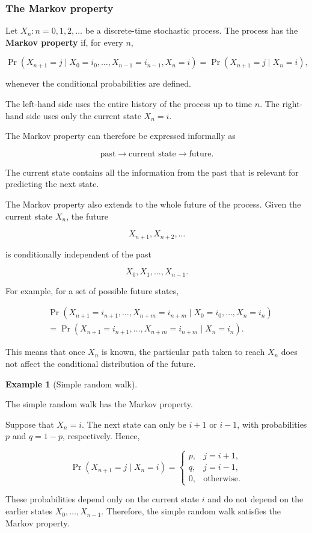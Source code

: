 \documentclass[
  letterpaper,
  DIV=11,
  numbers=noendperiod]{scrartcl}
\theoremstyle{definition}
\newtheorem{example}{Example}[section]
\theoremstyle{remark}
\begin{document}
\subsubsection{The Markov property}\label{the-markov-property-1}

Let \({X_n:n=0,1,2,\ldots}\) be a discrete-time stochastic process. The
process has the \textbf{Markov property} if, for every \(n\),

\[
\Pr(X_{n+1}=j\mid X_0=i_0,\ldots,X_{n-1}=i_{n-1},X_n=i)
=\Pr(X_{n+1}=j\mid X_n=i),
\]

whenever the conditional probabilities are defined.

The left-hand side uses the entire history of the process up to time
\(n\). The right-hand side uses only the current state \(X_n=i\).

The Markov property can therefore be expressed informally as

\[
\boxed{\text{past} \longrightarrow \text{current state} \longrightarrow \text{future}.}
\]

The current state contains all the information from the past that is
relevant for predicting the next state.

The Markov property also extends to the whole future of the process.
Given the current state \(X_n\), the future

\[
X_{n+1},X_{n+2},\ldots
\]

is conditionally independent of the past

\[
X_0,X_1,\ldots,X_{n-1}.
\]

For example, for a set of possible future states,

\[
\begin{aligned}
&\Pr(X_{n+1}=i_{n+1},\ldots,X_{n+m}=i_{n+m}\mid X_0=i_0,\ldots,X_n=i_n)\\
&=
\Pr(X_{n+1}=i_{n+1},\ldots,X_{n+m}=i_{n+m}\mid X_n=i_n).
\end{aligned}
\]

This means that once \(X_n\) is known, the particular path taken to
reach \(X_n\) does not affect the conditional distribution of the
future.

\begin{example}[Simple random
walk]\protect\hypertarget{exm-walk}{}\label{exm-walk}

The simple random walk has the Markov property.

Suppose that \(X_n=i\). The next state can only be \(i+1\) or \(i-1\),
with probabilities \(p\) and \(q=1-p\), respectively. Hence,

\[
\Pr(X_{n+1}=j\mid X_n=i)=
\begin{cases}
p, & j=i+1,\\
q, & j=i-1,\\
0, & \text{otherwise}.
\end{cases}
\]

These probabilities depend only on the current state \(i\) and do not
depend on the earlier states \(X_0,\ldots,X_{n-1}\). Therefore, the
simple random walk satisfies the Markov property.

\end{example}
\end{document}
